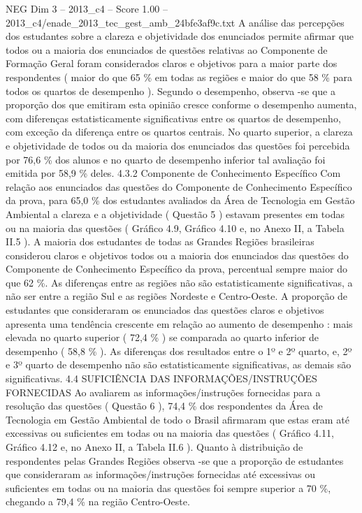 \begin{textsample}{NEG Dim 3 – 2013\_c4 – Score 1.00 – 2013\_c4/enade\_2013\_tec\_gest\_amb\_24bfe3af9c.txt}
A análise das percepções dos estudantes sobre a clareza e objetividade dos enunciados permite afirmar que todos ou a maioria dos enunciados de questões relativas ao Componente de Formação Geral foram considerados claros e objetivos para a maior parte dos respondentes ( maior do que 65 \% em todas as regiões e maior do que 58 \% para todos os quartos de desempenho ).
Segundo o desempenho, observa -se que a proporção dos que emitiram esta opinião cresce conforme o desempenho aumenta, com diferenças estatisticamente significativas entre os quartos de desempenho, com exceção da diferença entre os quartos centrais.
No quarto superior, a clareza e objetividade de todos ou da maioria dos enunciados das questões foi percebida por 76,6 \% dos alunos e no quarto de desempenho inferior tal avaliação foi emitida por 58,9 \% deles. 4.3.2 Componente de Conhecimento Específico Com relação aos enunciados das questões do Componente de Conhecimento Específico da prova, para 65,0 \% dos estudantes avaliados da Área de Tecnologia em Gestão Ambiental a clareza e a objetividade ( Questão 5 ) estavam presentes em todas ou na maioria das questões ( Gráfico 4.9, Gráfico 4.10 e, no Anexo II, a Tabela II.5 ).
A maioria dos estudantes de todas as Grandes Regiões brasileiras considerou claros e objetivos todos ou a maioria dos enunciados das questões do Componente de Conhecimento Específico da prova, percentual sempre maior do que 62 \%.
As diferenças entre as regiões não são estatisticamente significativas, a não ser entre a região Sul e as regiões Nordeste e Centro-Oeste.
A proporção de estudantes que consideraram os enunciados das questões claros e objetivos apresenta uma tendência crescente em relação ao aumento de desempenho : mais elevada no quarto superior ( 72,4 \% ) se comparada ao quarto inferior de desempenho ( 58,8 \% ).
As diferenças dos resultados entre o 1º e 2º quarto, e, 2º e 3º quarto de desempenho não são estatisticamente significativas, as demais são significativas. 4.4 SUFICIÊNCIA DAS INFORMAÇÕES/INSTRUÇÕES FORNECIDAS Ao avaliarem as informações/instruções fornecidas para a resolução das questões ( Questão 6 ), 74,4 \% dos respondentes da Área de Tecnologia em Gestão Ambiental de todo o Brasil afirmaram que estas eram até excessivas ou suficientes em todas ou na maioria das questões ( Gráfico 4.11, Gráfico 4.12 e, no Anexo II, a Tabela II.6 ).
Quanto à distribuição de respondentes pelas Grandes Regiões observa -se que a proporção de estudantes que consideraram as informações/instruções fornecidas até excessivas ou suficientes em todas ou na maioria das questões foi sempre superior a 70 \%, chegando a 79,4 \% na região Centro-Oeste.

\end{textsample}
